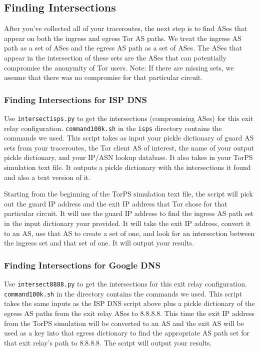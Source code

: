 \documentclass{article}
\begin{document}
\subsection{Finding Intersections}
After you've collected all of your traceroutes, the next step is to find ASes that
appear on both the ingress and egress Tor AS paths. We treat the ingress AS path
as a set of ASes and the egress AS path as a set of ASes. The ASes that appear
in the intersection of these sets are the ASes that can potentially compromise
the anonymity of Tor users. Note: If there are missing sets, we assume that
there was no compromise for that particular circuit.

\subsubsection{Finding Intersections for ISP DNS}
Use {\tt intersect\textunderscore isps.py} to get the intersections (compromising ASes) for
this exit relay configuration. {\tt command\textunderscore 100k.sh} in the {\tt isps}
directory contains the commands we used. This script takes as input your pickle dictionary of
guard AS sets from your traceroutes, the Tor client AS of interest, the name of your
output pickle
dictionary, and your IP/ASN lookup database. It also takes in your TorPS simulation
text file. It outputs a pickle dictionary with the intersections it found and also
a text version of it.

Starting from the beginning of the TorPS simulation text file,
the script will pick out the guard IP address and the exit IP address that
Tor chose for that particular circuit. It will use the guard IP address to find
the ingress AS path set in the input dictionary your provided. It will take the
exit IP address, convert it to an AS, use that AS to create a set of one, and
look for an intersection between the ingress set and that set of one. It will
output your results.

\subsubsection{Finding Intersections for Google DNS}
Use {\tt intersect\textunderscore 8888.py} to get the intersections for
this exit relay configuration. {\tt command\textunderscore 100k.sh} in the
 directory contains the commands we used. This script takes the same inputs as the ISP
DNS script above
plus a pickle dictionary of the egress AS paths from the exit relay ASes to 8.8.8.8.
This time the exit IP address from the TorPS simulation will be converted to an
AS and the exit AS will be used as a key
into that egress dictionary to find the appropriate AS path set for that exit relay's
path to 8.8.8.8. The script will output your results.
\end{document}

